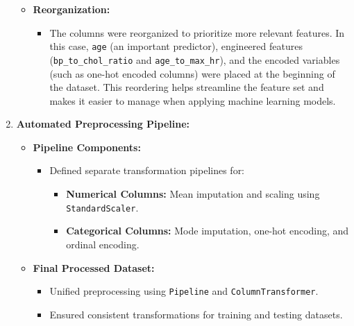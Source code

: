 \documentclass[pdflatex,sn-nature,Numbered]{sn-jnl}%
\theoremstyle{thmstyleone}%
\theoremstyle{thmstyletwo}%
\theoremstyle{thmstylethree}%
\begin{document}
\begin{enumerate}
\begin{itemize}
        \item \textbf{Reorganization:}
        \begin{itemize}
            \item The columns were reorganized to prioritize more relevant features. In this case, \texttt{age} (an important predictor), engineered features (\texttt{bp\_to\_chol\_ratio} and \texttt{age\_to\_max\_hr}), and the encoded variables (such as one-hot encoded columns) were placed at the beginning of the dataset. This reordering helps streamline the feature set and makes it easier to manage when applying machine learning models.
        \end{itemize}
    \end{itemize}


    \item \textbf{Automated Preprocessing Pipeline:}
    \begin{itemize}
        \item \textbf{Pipeline Components:}
        \begin{itemize}
            \item Defined separate transformation pipelines for:
            \begin{itemize}
                \item \textbf{Numerical Columns:} Mean imputation and scaling using \texttt{StandardScaler}.
                \item \textbf{Categorical Columns:} Mode imputation, one-hot encoding, and ordinal encoding.
            \end{itemize}
        \end{itemize}
        \item \textbf{Final Processed Dataset:}
        \begin{itemize}
            \item Unified preprocessing using \texttt{Pipeline} and \texttt{ColumnTransformer}.
            \item Ensured consistent transformations for training and testing datasets.
        \end{itemize}
    \end{itemize}


\end{enumerate}
\end{document}
